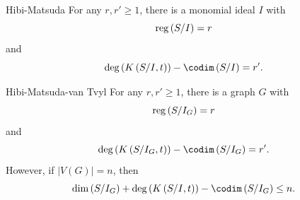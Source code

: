 \documentclass[co439]{subfiles}
\begin{document}
    \rruleline
    
    \begin{theorem}{Hibi-Matsuda}
        For any $r,r'\geq 1$, there is a monomial ideal $I$ with
        \begin{equation*}
            \operatorname{reg}\left( S /I \right) = r
        \end{equation*}
        and
        \begin{equation*}
            \deg\left( K\left( S /I, t \right) \right) - \codim\left( S /I \right) = r'.
        \end{equation*}
    \end{theorem}

    \rruleline

    \begin{theorem}{Hibi-Matsuda-van Tvyl}
        For any $r,r'\geq 1$, there is a graph $G$ with
        \begin{equation*}
            \operatorname{reg}\left( S /I_G \right) = r
        \end{equation*}
        and
        \begin{equation*}
            \deg\left( K\left( S/ I_G, t \right) \right) - \codim\left( S /I_G \right) = r'.
        \end{equation*}
        However, if $\left| V\left( G \right) \right| = n$, then
        \begin{equation*}
            \dim\left( S /I_G  \right) +\deg\left( K\left( S /I,t \right) \right) - \codim\left( S /I_G \right) \leq n.
        \end{equation*}
    \end{theorem}

    \rruleline

    
    
    
    
    
    
    
    
    
    
    
    
    
    
    
    
    
    
    
    
    
    
    
    
    
    
    
    
    
    
    
    
    
    
    
    
\end{document}
